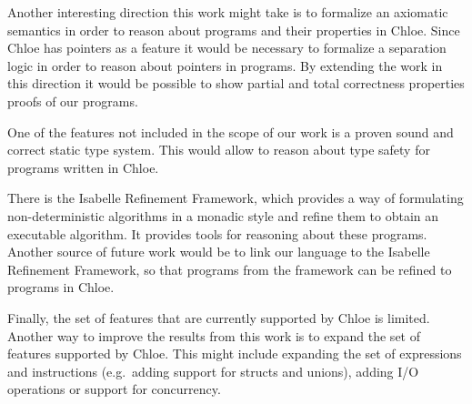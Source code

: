 Another interesting direction this work might take is to formalize an axiomatic semantics in order to reason about programs and their properties in Chloe.
Since Chloe has pointers as a feature it would be necessary to formalize a separation logic\cite{sep-logic} in order to reason about pointers in programs.
By extending the work in this direction it would be possible to show partial and total correctness properties proofs of our programs.

One of the features not included in the scope of our work is a proven sound and correct static type system.
This would allow to reason about type safety for programs written in Chloe.

There is the Isabelle Refinement Framework\cite{Refine_Monadic-AFP}, which provides a way of formulating non-deterministic algorithms in a monadic style and refine them to obtain an executable algorithm.
It provides tools for reasoning about these programs.
Another source of future work would be to link our language to the Isabelle Refinement Framework, so that programs from the framework can be refined to programs in Chloe.

Finally, the set of features that are currently supported by Chloe is limited.
Another way to improve the results from this work is to expand the set of features supported by Chloe.
This might include expanding the set of expressions and instructions (e.g.\ adding support for structs and unions), adding I/O operations or support for concurrency.
